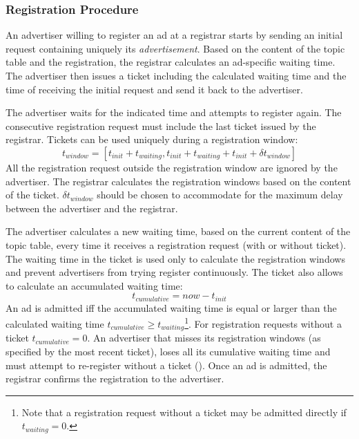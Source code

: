 \subsubsection{Registration Procedure}
An advertiser willing to register an ad at a registrar starts by sending an initial request containing uniquely its \emph{advertisement}. Based on the content of the topic table and the registration, the registrar calculates an ad-specific waiting time. The advertiser then issues a ticket including the calculated waiting time and the time of receiving the initial request and send it back to the advertiser. 

The advertiser waits for the indicated time and attempts to register again. The consecutive registration request must include the last ticket issued by the registrar. Tickets can be used uniquely during a registration window:
\begin{equation}\label{eq:registration_window}
    t_\textit{window} = [t_\textit{init} + t_\textit{waiting}, t_\textit{init} + t_\textit{waiting} + t_\textit{init} + \delta t_\textit{window}]
\end{equation}
All the registration request outside the registration window are ignored by the advertiser. The registrar calculates the registration windows based on the content of the ticket. $\delta t_\textit{window}$ should be chosen to accommodate for the maximum delay between the advertiser and the registrar. 

The advertiser calculates a new waiting time, based on the current content of the topic table, every time it receives a registration request (with or without ticket). The waiting time in the ticket is used only to calculate the registration windows and prevent advertisers from trying register continuously. The ticket also allows to calculate an accumulated waiting time:
\begin{equation}
    t_\textit{cumulative} = \textit{now} - t_\textit{init}
\end{equation}
An ad is admitted iff the accumulated waiting time is equal or larger than the calculated waiting time $t_\textit{cumulative} \ge t_\textit{waiting}$\footnote{Note that a registration request without a ticket may be admitted directly if $t_\textit{waiting}=0$.}. For registration requests without a ticket $t_\textit{cumulative} = 0$. An advertiser that misses its registration windows (as specified by the most recent ticket), loses all its cumulative waiting time and must attempt to re-register without a ticket (). Once an ad is admitted, the registrar confirms the registration to the advertiser. 

